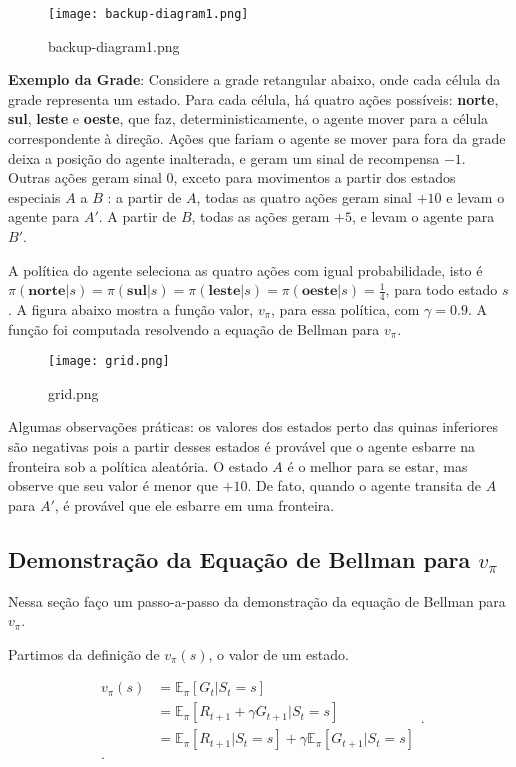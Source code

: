 \documentclass{article}
\begin{document}
\begin{figure}[htpb]
  \centering
  \texttt{[image: backup-diagram1.png]}
  \caption{backup-diagram1.png}
  \label{fig:backup-diagram1-png}
\end{figure}
 

\textbf{Exemplo da Grade}: Considere a grade retangular abaixo, onde cada célula da grade representa um estado. Para cada célula, há quatro ações possíveis: \textbf{norte}, \textbf{sul}, \textbf{leste} e \textbf{oeste}, que faz, deterministicamente, o agente mover para a célula correspondente à direção. Ações que fariam o agente se mover para fora da grade deixa a posição do agente inalterada, e geram um sinal de recompensa $-1$. Outras ações geram sinal $0$, exceto para movimentos a partir dos estados especiais $A$ a $B$ : a partir de $A$, todas as quatro ações geram sinal $+10$ e levam o agente para $A'$. A partir de $B$, todas as ações geram $+5$, e levam o agente para $B'$.

A política do agente seleciona as quatro ações com igual probabilidade, isto é $\pi(\textbf{norte}|s)=\pi(\textbf{sul}|s)=\pi(\textbf{leste}|s)=\pi(\textbf{oeste}|s)= \frac{1}{4}$, para todo estado $s$. A figura abaixo mostra a função valor, $v_{\pi}$, para essa política, com $\gamma=0.9$. A função foi computada resolvendo a equação de Bellman para  $v_{\pi}$.

\begin{figure}[htpb]
  \centering
  \texttt{[image: grid.png]}
  \caption{grid.png}
  \label{fig:grid-png}
\end{figure}

Algumas observações práticas: os valores dos estados perto das quinas inferiores são negativas pois a partir desses estados é provável que o agente esbarre na fronteira sob a política aleatória. O estado $A$ é o melhor para se estar, mas observe que seu valor é menor que $+10$. De fato, quando o agente transita de $A$ para $A'$, é provável que ele esbarre em uma fronteira. 
\newpage
\subsection{Demonstração da Equação de Bellman para $v_{\pi}$}
Nessa seção faço um passo-a-passo da demonstração da equação de Bellman para $v_{\pi}$. 

Partimos da definição de $v_{\pi}(s)$, o valor de um estado.

\[
  \begin{align*}
    v_{\pi}(s) &= \mathbb{E}_{\pi}[G_{t}|S_t=s]\\
               &=\mathbb{E}_{\pi}[R_{t+1}+\gamma G_{t+1} | S_t =s]\\
               &=\mathbb{E}_{\pi}[R_{t+1}|S_t=s]+\gamma\mathbb{E}_{\pi}[G_{t+1} | S_t =s]\\
  .\end{align*}
.\] 
\end{document}

